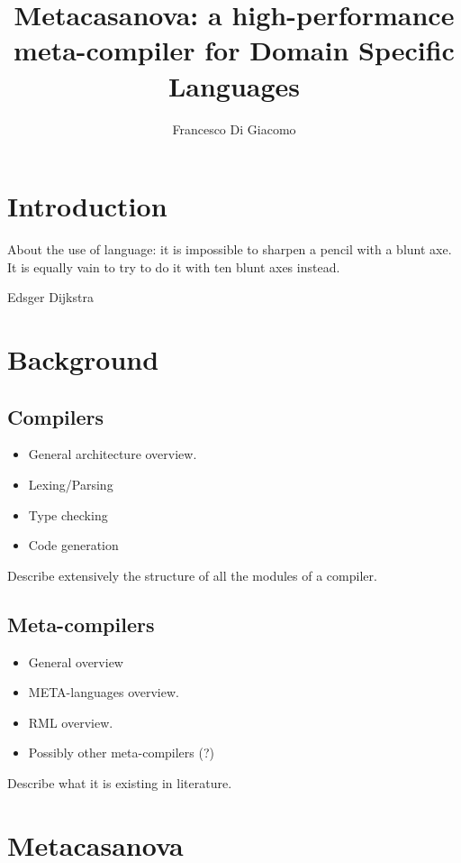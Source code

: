 \documentclass[8pt,a5paper]{extbook}
\author{Francesco Di Giacomo}
\title{Metacasanova: a high-performance meta-compiler for Domain Specific Languages}
\date { }
\begin{document}
\mainmatter
\maketitle

\tableofcontents



\chapter{Introduction}
\epigraph{About the use of language: it is impossible to sharpen a pencil with a blunt axe. It is equally vain to try to do it with ten blunt axes instead.}{Edsger Dijkstra}

\label{ch:introduction}
	

\chapter{Background}
\section{Compilers}

\begin{itemize}[noitemsep]
	\item General architecture overview.
	\item Lexing/Parsing
	\item Type checking
	\item Code generation
\end{itemize}

Describe extensively the structure of all the modules of a compiler.

\section{Meta-compilers}

\begin{itemize}[noitemsep]
	\item General overview
	\item META-languages overview.
	\item RML overview.
	\item Possibly other meta-compilers (?)
\end{itemize}

Describe what it is existing in literature.
	
\chapter{Metacasanova}
		
\label{ch:metacasanova}
\end{document}
